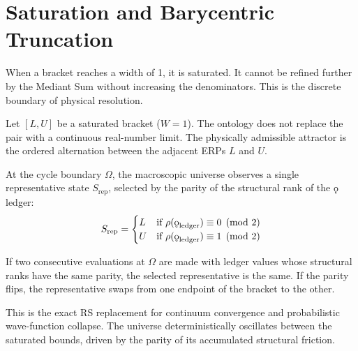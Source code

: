 \documentclass[11pt, letterpaper]{article}
\newcommand{\koppa}{\mathbin{\text{\rm\k{o}}}}
\begin{document}
\section{Saturation and Barycentric Truncation}

When a bracket reaches a width of 1, it is saturated. It cannot be refined further by the Mediant Sum without increasing the denominators. This is the discrete boundary of physical resolution.

\begin{theorem}\label{thm:parity_selection}
\begin{rsbox}
Let $[L, U]$ be a saturated bracket ($W=1$). The ontology does not replace the pair with a continuous real-number limit. The physically admissible attractor is the ordered alternation between the adjacent ERPs $L$ and $U$.

At the cycle boundary $\Omega$, the macroscopic universe observes a single representative state $S_{\text{rep}}$, selected by the parity of the structural rank of the $\koppa$ ledger:
\[
S_{\text{rep}} = 
\begin{cases} 
L & \text{if } \rho(\koppa_{\text{ledger}}) \equiv 0 \pmod 2 \\
U & \text{if } \rho(\koppa_{\text{ledger}}) \equiv 1 \pmod 2 
\end{cases}
\]

If two consecutive evaluations at $\Omega$ are made with ledger values whose structural ranks have the same parity, the selected representative is the same. If the parity flips, the representative swaps from one endpoint of the bracket to the other.

This is the exact RS replacement for continuum convergence and probabilistic wave-function collapse. The universe deterministically oscillates between the saturated bounds, driven by the parity of its accumulated structural friction.
\end{rsbox}
\end{theorem}
\end{document}
